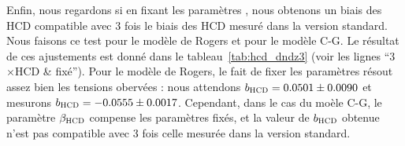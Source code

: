 \documentclass[11pt, twoside, a4paper, openright]{report}
\begin{document}
Enfin, nous regardons si en fixant les paramètres \lya{}, nous obtenons un biais des HCD compatible avec 3 fois le biais des HCD mesuré dans la version standard. Nous faisons ce test pour le modèle de Rogers et pour le modèle C-G. Le résultat de ces ajustements est donné dans le tableau~\ref{tab:hcd_dndz3} (voir les lignes ``3$\times$HCD \& \lya{} fixé'').
Pour le modèle de Rogers, le fait de fixer les paramètres \lya{} résout assez bien les tensions obervées : nous attendons $b_{\textsc{HCD}} = \num{0.0501} \pm \num{0.0090}$ et mesurons $b_{\textsc{HCD}} = -\num{0.0555} \pm \num{0.0017}$.
Cependant, dans le cas du moèle C-G, le paramètre $\beta_{\textsc{HCD}}$ compense les paramètres \lya{} fixés, et la valeur de $b_{\textsc{HCD}}$ obtenue n'est pas compatible avec 3 fois celle mesurée dans la version standard.
\end{document}
